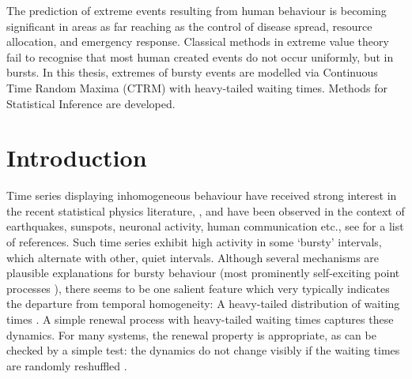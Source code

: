 \documentclass[honours,12pt]{unswthesis}
\newcommand{\1}{\mathbf 1}
\newcommand\blankpage{%
    \null
    \thispagestyle{empty}%
    \addtocounter{page}{-1}%
    \newpage}
\numberwithin{equation}{section}
\theoremstyle{definition}
\theoremstyle{remark}
\begin{document}


The prediction of extreme events resulting from human
behaviour is becoming significant in areas as far reaching as the
control of disease spread, resource allocation, and emergency
response.  Classical methods in extreme value theory fail to recognise
that most human created events do not occur uniformly, but in bursts.
In this thesis, 
extremes of bursty events are modelled via Continuous Time Random Maxima
(CTRM) with heavy-tailed waiting times.  Methods for Statistical Inference
are developed. 
\afterpage{\blankpage}


\afterpreface

%
%

\afterpage{\blankpage}

\chapter{Introduction}\label{s-intro}
Time series displaying inhomogeneous behaviour have received strong interest in 
the recent statistical physics literature,
\cite{Barabasi2005,Oliveira2005,Vasquez2006,Vazquez2007,Omi2011,
Min2010,Karsai2011,Bagrow2013},
and have been observed in the context of earthquakes, sunspots, neuronal
activity, human communication etc., see \cite{Karsai2012,Vajna2013} for a 
list of references.
Such time series exhibit high activity in some `bursty' intervals, which 
alternate with other, quiet intervals.  Although several mechanisms are 
plausible explanations for bursty behaviour
(most prominently self-exciting point processes \cite{hawkes1971point}),
there seems to be one salient
feature which very typically indicates the departure from temporal homogeneity: 
A heavy-tailed distribution of waiting times
\cite{Vasquez2006,Karsai2012,Vajna2013}. 
A simple renewal process with heavy-tailed waiting times captures these
dynamics. For many systems, the renewal property is appropriate, as can be
checked by a simple test: the dynamics do not change visibly if the
waiting times are randomly reshuffled \cite{Karsai2012}.
\end{document}
